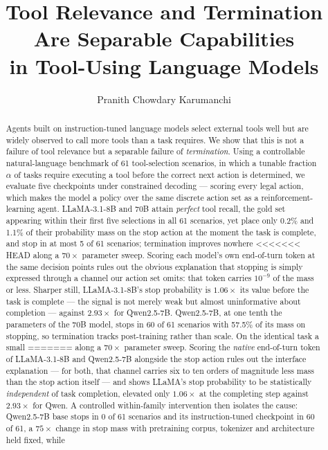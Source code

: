 \documentclass[11pt]{article}
\title{Tool Relevance and Termination Are Separable Capabilities\\
in Tool-Using Language Models}
\author{Pranith Chowdary Karumanchi}
\date{}
\begin{document}
\maketitle

\begin{abstract}
Agents built on instruction-tuned language models select external tools well but
are widely observed to call more tools than a task requires. We show that this is
not a failure of tool relevance but a separable failure of \emph{termination}.
Using a controllable natural-language benchmark of 61 tool-selection scenarios, in
which a tunable fraction $\alpha$ of tasks require executing a tool before the
correct next action is determined, we evaluate five checkpoints under
constrained decoding --- scoring every legal action, which makes the model a policy
over the same discrete action set as a reinforcement-learning agent.
LLaMA-3.1-8B and 70B attain \emph{perfect} tool recall, the gold set appearing
within their first five selections in all 61 scenarios, yet place only 0.2\% and
1.1\% of their probability mass on the stop action at the moment the task is
complete, and stop in at most 5 of 61 scenarios; termination improves nowhere
<<<<<<< HEAD
along a $70\times$ parameter sweep. Scoring each model's own end-of-turn token
at the same decision points rules out the obvious explanation that stopping is
simply expressed through a channel our action set omits: that token carries
$10^{-9}$ of the mass or less. Sharper still, LLaMA-3.1-8B's stop probability is
$1.06\times$ its value before the task is complete --- the signal is not merely
weak but almost uninformative about completion --- against $2.93\times$ for
Qwen2.5-7B. Qwen2.5-7B, at one tenth the parameters of the
70B model, stops in 60 of 61 scenarios with 57.5\% of its mass on stopping, so
termination tracks post-training rather than scale. On the identical task a small
=======
along a $70\times$ parameter sweep. Scoring the \emph{native} end-of-turn token of
LLaMA-3.1-8B and Qwen2.5-7B alongside the stop action rules out the interface
explanation --- for both, that channel carries six to ten orders of magnitude
less mass than the stop action itself --- and shows LLaMA's stop probability to be
statistically \emph{independent} of task completion, elevated only $1.06\times$ at
the completing step against $2.93\times$ for Qwen. A controlled
within-family intervention then isolates the cause: Qwen2.5-7B base stops in 0 of
61 scenarios and its instruction-tuned checkpoint in 60 of 61, a $75\times$ change
in stop mass with pretraining corpus, tokenizer and architecture held fixed, while

\end{abstract}
\end{document}
